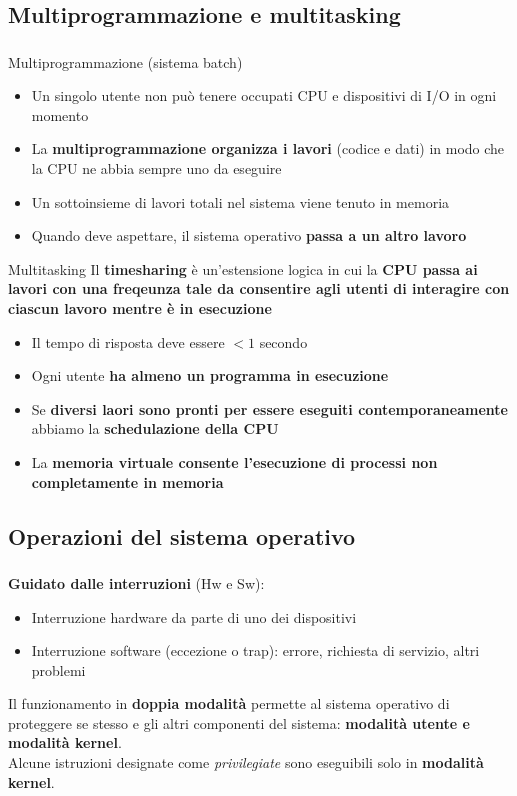 \documentclass{beamer}
\newenvironment{mainframe}{
	\begin{frame}
		\frametitle{\insertsubsection}
		\framesubtitle{\insertsection}
	}{
	\end{frame}
}
\begin{document}
\subsection{Multiprogrammazione e multitasking}
\begin{mainframe}
	\begin{block}{Multiprogrammazione (sistema batch)}
		\begin{itemize}
			\item Un singolo utente non può tenere occupati CPU e dispositivi di I/O in ogni momento
			\item La \textbf{multiprogrammazione organizza i lavori} (codice e dati) in modo che la CPU ne abbia sempre uno da eseguire
			\item Un sottoinsieme di lavori totali nel sistema viene tenuto in memoria
			\item Quando deve aspettare, il sistema operativo \textbf{passa a un altro lavoro}
		\end{itemize}
	\end{block}
\end{mainframe}
\begin{frame}
	\begin{block}{Multitasking}
		Il \textbf{timesharing} è un'estensione logica in cui la \textbf{CPU passa ai lavori con una freqeunza tale da consentire agli utenti di interagire con ciascun lavoro mentre è in esecuzione}
		\begin{itemize}
			\item Il tempo di risposta deve essere $<1$ secondo
			\item Ogni utente \textbf{ha almeno un programma in esecuzione}
			\item Se \textbf{diversi laori sono pronti per essere eseguiti contemporaneamente} abbiamo la \textbf{schedulazione della CPU}
			\item La \textbf{memoria virtuale consente l'esecuzione di processi non completamente in memoria}
		\end{itemize}
	\end{block}
\end{frame}
\subsection{Operazioni del sistema operativo}
\begin{mainframe}
	\textbf{Guidato dalle interruzioni} (Hw e Sw):
	\begin{itemize}
		\item Interruzione hardware da parte di uno dei dispositivi
		\item Interruzione software (eccezione o trap): errore, richiesta di servizio, altri problemi
	\end{itemize}
	Il funzionamento in \textbf{doppia modalità} permette al sistema operativo di proteggere se stesso e gli altri componenti del sistema: \textbf{modalità utente e modalità kernel}.\\
	Alcune istruzioni designate come \textit{privilegiate} sono eseguibili solo in \textbf{modalità kernel}.
\end{mainframe}
\end{document}
